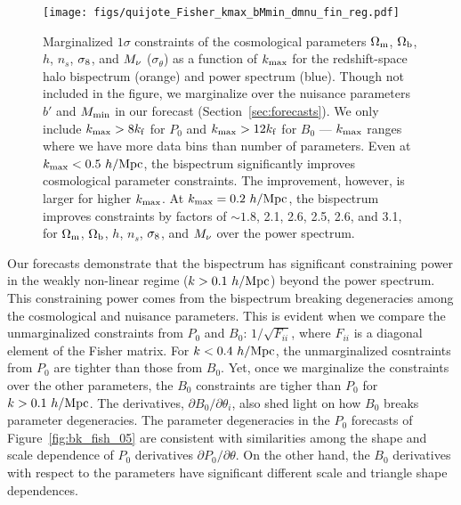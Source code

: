 \begin{figure}
\begin{center}
    \texttt{[image: figs/quijote\_Fisher\_kmax\_bMmin\_dmnu\_fin\_reg.pdf]} 
    \caption{Marginalized $1\sigma$ constraints of the cosmological parameters 
    $\Omega_{\rm m}$, $\Omega_{\rm b}$, $h$, $n_s$, $\sigma_8$, and $M_\nu$ ($\sigma_\theta$) as a function 
    of $k_{\rm max}$ for the redshift-space halo bispectrum (orange) and power spectrum (blue). 
    Though not included in the figure, we marginalize over the nuisance parameters
    $b'$ and $M_{\rm min}$ in our forecast (Section~\ref{sec:forecasts}). We only 
    include $k_{\rm max} > 8 k_{\rm f}$ for $P_0$ and $k_{\rm max} > 12 k_{\rm f}$ 
    for $B_0$ --- $k_{\rm max}$ ranges where we have more data bins than number of 
    parameters. Even at $k_{\rm max} < 0.5~h/{\rm Mpc}$, the bispectrum significantly 
    improves cosmological parameter constraints. The improvement, however, is larger 
    for higher $k_{\rm max}$. At $k_{\rm max} = 0.2~h/{\rm Mpc}$, the bispectrum 
    improves constraints by factors of $\sim 1.8$, 2.1, 2.6, 2.5, 2.6, and 3.1,
    for $\Omega_{\rm m}$, $\Omega_{\rm b}$, $h$, $n_s$, $\sigma_8$, and $M_\nu$ over the power spectrum.}
\label{fig:fish_kmax}
\end{center}
\end{figure}
Our forecasts demonstrate that the bispectrum has significant constraining power 
in the weakly non-linear regime ($k > 0.1~h/{\rm Mpc}$) beyond the power spectrum. This constraining power 
comes from the bispectrum breaking degeneracies among the cosmological and 
nuisance parameters. This is evident when we compare the unmarginalized 
constraints from $P_0$ and $B_0$: $1/\sqrt{F_{ii}}$, where $F_{ii}$ is a 
diagonal element of the Fisher matrix. For $k < 0.4~h/{\rm Mpc}$, the unmarginalized 
cosntraints from $P_0$ are tighter than those from $B_0$. Yet, once we 
marginalize the constraints over the other parameters, the $B_0$ constraints 
are tigher than $P_0$ for $k > 0.1~h/{\rm Mpc}$. The derivatives, 
$\partial B_0/\partial \theta_i$, also shed light on how $B_0$ breaks parameter 
degeneracies. The parameter degeneracies in the $P_0$ forecasts of Figure~\ref{fig:bk_fish_05} 
are consistent with similarities among the shape and scale dependence of 
$P_0$ derivatives $\partial P_0/\partial \theta$. On the other hand, the 
$B_0$ derivatives with respect to the parameters have significant different 
scale and triangle shape dependences.  

